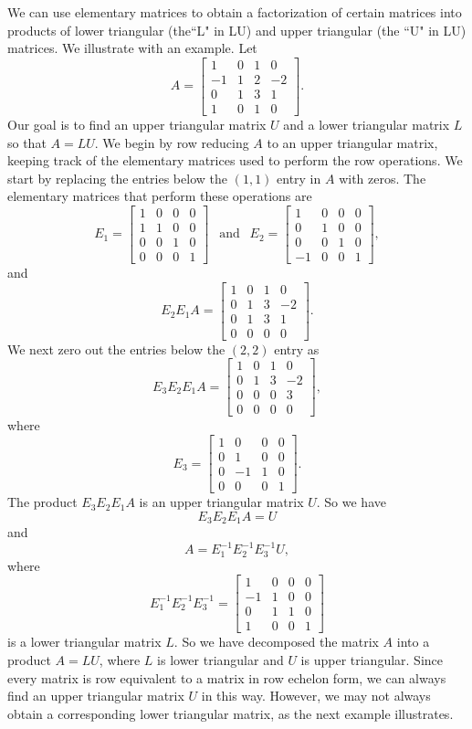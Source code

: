 We can use elementary matrices to obtain a factorization of certain matrices into products of lower triangular (the``L" in LU) and upper triangular (the ``U" in LU) matrices. We illustrate with an example. Let
\[A = \left[ \begin{array}{rccr} 1&0&1&0\\-1&1&2&-2 \\0&1&3&1\\1&0&1&0\end{array}  \right].\]
Our goal is to find an upper triangular matrix $U$ and a lower triangular matrix $L$ so that $A = LU$. We begin by row reducing $A$ to an upper triangular matrix, keeping track of the elementary matrices used to perform the row operations. We start by replacing the entries below the $(1,1)$ entry in $A$ with zeros. The elementary matrices that perform these operations are
\[E_1 = \left[ \begin{array}{cccc} 1&0&0&0\\1&1&0&0 \\0&0&1&0\\0&0&0&1\end{array}  \right] \ \ \text{ and } \ \ E_2 = \left[ \begin{array}{rccc} 1&0&0&0\\0&1&0&0 \\0&0&1&0\\-1&0&0&1\end{array}  \right],\]
and
\[E_2E_1A = \left[ \begin{array}{ccrr} 1&0&1&0\\0&1&3&-2 \\0&1&3&1\\0&0&0&0\end{array}  \right].\]
We next zero out the entries below the $(2,2)$ entry as
\[E_3E_2E_1A = \left[ \begin{array}{ccrr} 1&0&1&0\\0&1&3&-2 \\0&0&0&3\\0&0&0&0\end{array}  \right],\]
where
\[E_3 = \left[ \begin{array}{crcc} 1&0&0&0\\0&1&0&0 \\0&-1&1&0\\0&0&0&1\end{array}  \right].\]
The product $E_3E_2E_1A$ is an upper triangular matrix $U$. So we have
\[E_3E_2E_1A = U\]
and
\[A = E_1^{-1}E_2^{-1}E_3^{-1}U,\]
where
\[E_1^{-1}E_2^{-1}E_3^{-1} = \left[ \begin{array}{rccc} 1&0&0&0\\-1&1&0&0 \\0&1&1&0\\1&0&0&1\end{array}  \right]\]
is a lower triangular matrix $L$. So we have decomposed the matrix $A$ into a product $A = LU$, where $L$ is lower triangular and $U$ is upper triangular. Since every matrix is row equivalent to a matrix in row echelon form, we can always find an upper triangular matrix $U$ in this way. However, we may not always obtain a corresponding lower triangular matrix, as the next example illustrates. 

